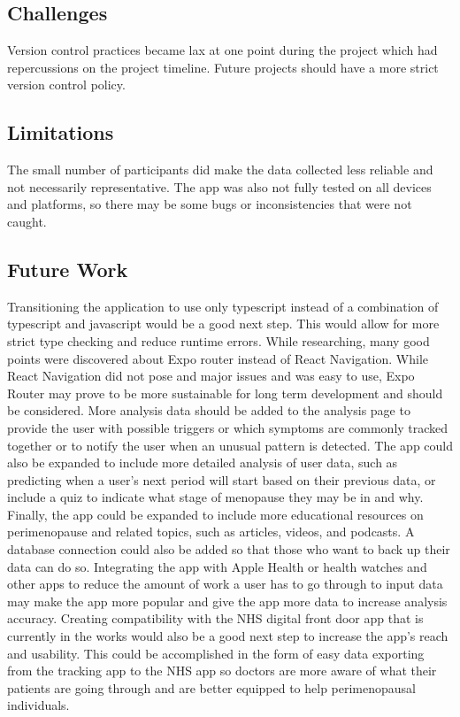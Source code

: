 \subsection{Challenges}
Version control practices became lax at one point during the project which had repercussions on the project timeline. Future projects should have a more strict version control policy. 

\subsection{Limitations}
The small number of participants did make the data collected less reliable and not necessarily representative. The app was also not fully tested on all devices and platforms, so there may be some bugs or inconsistencies that were not caught.

\subsection{Future Work}
Transitioning the application to use only typescript instead of a combination of typescript and javascript would be a good next step. This would allow for more strict type checking and reduce runtime errors. While researching, many good points were discovered about Expo router instead of React Navigation. While React Navigation did not pose and major issues and was easy to use, Expo Router may prove to be more sustainable for long term development and should be considered. More analysis data should be added to the analysis page to provide the user with possible triggers or which symptoms are commonly tracked together or to notify the user when an unusual pattern is detected. The app could also be expanded to include more detailed analysis of user data, such as predicting when a user's next period will start based on their previous data, or include a quiz to indicate what stage of menopause they may be in and why. Finally, the app could be expanded to include more educational resources on perimenopause and related topics, such as articles, videos, and podcasts. A database connection could also be added so that those who want to back up their data can do so. Integrating the app with Apple Health or health watches and other apps to reduce the amount of work a user has to go through to input data may make the app more popular and give the app more data to increase analysis accuracy. Creating compatibility with the NHS digital front door app that is currently in the works would also be a good next step to increase the app's reach and usability. This could be accomplished in the form of easy data exporting from the tracking app to the NHS app so doctors are more aware of what their patients are going through and are better equipped to help perimenopausal individuals.


